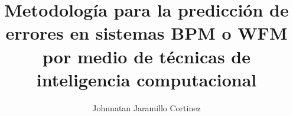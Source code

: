 
\title{Metodología para la predicción de errores en sistemas BPM o WFM por medio de técnicas de inteligencia computacional}


\author{Johnnatan Jaramillo Cortinez}












